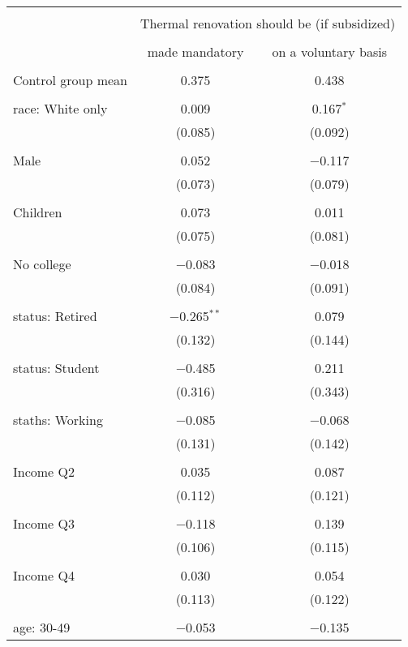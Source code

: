 
\begin{tabular}{@{\extracolsep{5pt}}lcc} 
\\[-1.8ex]\hline 
\hline \\[-1.8ex] 
 & \multicolumn{2}{c}{Thermal renovation should be (if subsidized)} \\ 
\cline{2-3} 
\\[-1.8ex] & made mandatory & on a voluntary basis \\ 
\hline \\[-1.8ex] 
 Control group mean & 0.375 & 0.438  \\ \hline \\[-1.8ex] race: White only & 0.009 & 0.167$^{*}$ \\ 
  & (0.085) & (0.092) \\ 
  & & \\ 
 Male & 0.052 & $-$0.117 \\ 
  & (0.073) & (0.079) \\ 
  & & \\ 
 Children & 0.073 & 0.011 \\ 
  & (0.075) & (0.081) \\ 
  & & \\ 
 No college & $-$0.083 & $-$0.018 \\ 
  & (0.084) & (0.091) \\ 
  & & \\ 
 status: Retired & $-$0.265$^{**}$ & 0.079 \\ 
  & (0.132) & (0.144) \\ 
  & & \\ 
 status: Student & $-$0.485 & 0.211 \\ 
  & (0.316) & (0.343) \\ 
  & & \\ 
 staths: Working & $-$0.085 & $-$0.068 \\ 
  & (0.131) & (0.142) \\ 
  & & \\ 
 Income Q2 & 0.035 & 0.087 \\ 
  & (0.112) & (0.121) \\ 
  & & \\ 
 Income Q3 & $-$0.118 & 0.139 \\ 
  & (0.106) & (0.115) \\ 
  & & \\ 
 Income Q4 & 0.030 & 0.054 \\ 
  & (0.113) & (0.122) \\ 
  & & \\ 
 age: 30-49 & $-$0.053 & $-$0.135 \\ 

\end{tabular}
